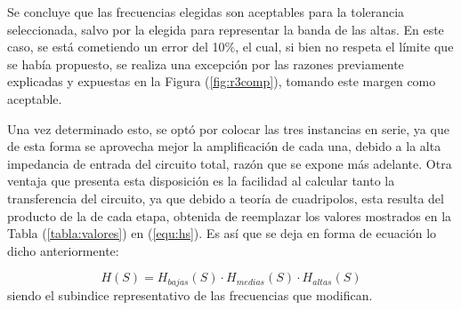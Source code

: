 Se concluye que las frecuencias elegidas son aceptables para la tolerancia seleccionada, salvo por la elegida para representar la banda de las altas. En este caso, se está cometiendo un error del 10\%, el cual, si bien no respeta el límite que se había propuesto, se realiza una excepción por las razones previamente explicadas y expuestas en la Figura (\ref{fig:r3comp}), tomando este margen como aceptable. 

Una vez determinado esto, se optó por colocar las tres instancias en serie, ya que de esta forma se aprovecha mejor la amplificación de cada una, debido a la alta impedancia de entrada del circuito total, razón que se expone más adelante. Otra ventaja que presenta esta disposición es la facilidad al calcular tanto la transferencia del circuito, ya que debido a teoría de cuadripolos, esta resulta del producto de la de cada etapa, obtenida de reemplazar los valores mostrados en la Tabla (\ref{tabla:valores}) en (\ref{equ:hs}). Es así que se deja en forma de ecuación lo dicho anteriormente:

\begin{equation}
	H(S) = H_{bajas}(S) \cdot H_{medias}(S) \cdot H_{altas}(S)
\end{equation}
siendo el subindice representativo de las frecuencias que modifican.

